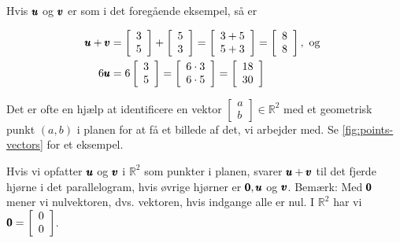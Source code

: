 \begin{example}
    Hvis $\pmb{u}$ og $\pmb{v}$ er som i det foregående eksempel, så er 

$$
\begin{aligned}
\pmb{u} + \pmb{v} & =\left[\begin{array}{l}
3 \\
5
\end{array}\right] + \left[\begin{array}{l}
5 \\
3
\end{array}\right] = \left[\begin{array}{l}
3+5 \\
5+3
\end{array}\right] = \left[\begin{array}{l}
8 \\
8
\end{array}\right], \text { og } \\
6 \pmb{u} & = 6\left[\begin{array}{l}
3 \\
5
\end{array}\right] = \left[\begin{array}{l}
6 \cdot 3 \\
6 \cdot 5
\end{array}\right] = \left[\begin{array}{l}
18 \\
30
\end{array}\right]
\end{aligned}
$$

\end{example}

\begin{remark}
    Det er ofte en hjælp at identificere en vektor $\left[\begin{array}{l}a \\ b\end{array}\right] \in \mathbb{R}^2$ med et geometrisk punkt $(a, b)$ i planen for at få et billede af det, vi arbejder med. Se \autoref{fig:points-vectors} for et eksempel.
\end{remark}

Hvis vi opfatter $\pmb{u}$ og $\pmb{v}$ i $\mathbb{R}^2$ som punkter i planen, svarer $\pmb{u} + \pmb{v}$ til det fjerde hjørne i det parallelogram, hvis øvrige hjørner er $\pmb{0}, \pmb{u}$ og $\pmb{v}$.
Bemærk: Med $\pmb{0}$ mener vi nulvektoren, dvs. vektoren, hvis indgange alle er nul. I $\mathbb{R}^2$ har vi $\pmb{0} = \left[\begin{array}{l}
0 \\
0
\end{array}\right]$.

